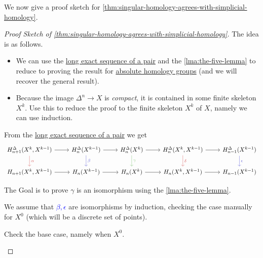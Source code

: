 We now give a proof sketch for \autoref{thm:singular-homology-agrees-with-simplicial-homology}.
\begin{proof}[Proof Sketch of \autoref{thm:singular-homology-agrees-with-simplicial-homology}]
	The idea is as follows.
	\begin{itemize}
		\item We can use the \hyperref[thm:long-exact-sequence-of-a-pair]{long exact sequence of a pair} and the \autoref{lma:the-five-lemma} to
		      reduce to proving the result for \hyperref[def:homology-group]{absolute homology groups} (and we will recover the general result).
		\item Because the image \(\Delta^n \to X\) is \emph{compact}, it is contained in some finite skeleton \(X^k\). Use this
		      to reduce the proof to the finite skeleton \(X^k\) of \(X\), namely we can use induction.
	\end{itemize}
	From the \hyperref[thm:long-exact-sequence-of-a-pair]{long exact sequence of a pair} we get
	\[
		\begin{tikzcd}
			{H^\Delta_{n+1}(X^k, X^{k-1})} & {H^\Delta_{n}(X^{k-1})} & {H^\Delta_{n}(X^{k})} & {H^\Delta_{n}(X^k, X^{k-1})} & {H^\Delta_{n-1}(X^{k-1})} \\
			{H_{n+1}(X^k, X^{k-1})} & {H_{n}(X^{k-1})} & {H_{n}(X^{k})} & {H_{n}(X^k, X^{k-1})} & {H_{n-1}(X^{k-1})}
			\arrow["\alpha", color={rgb,255:red,214;green,92;blue,92}, from=1-1, to=2-1]
			\arrow["\beta", color={rgb,255:red,92;green,92;blue,214}, from=1-2, to=2-2]
			\arrow["\gamma", color={rgb,255:red,124;green,194;blue,112}, from=1-3, to=2-3]
			\arrow["\delta", color={rgb,255:red,214;green,92;blue,92}, from=1-4, to=2-4]
			\arrow["\epsilon", color={rgb,255:red,92;green,92;blue,214}, from=1-5, to=2-5]
			\arrow[from=1-1, to=1-2]
			\arrow[from=1-2, to=1-3]
			\arrow[from=1-3, to=1-4]
			\arrow[from=1-4, to=1-5]
			\arrow[from=2-1, to=2-2]
			\arrow[from=2-2, to=2-3]
			\arrow[from=2-3, to=2-4]
			\arrow[from=2-4, to=2-5]
		\end{tikzcd}
	\]

	The Goal is to prove \(\gamma\) is an isomorphism using the \autoref{lma:the-five-lemma}.

	We assume that \textcolor{blue}{\(\beta, \epsilon \)} are isomorphisms by induction, checking the case manually for \(X^0\)
	(which will be a discrete set of points).
	\begin{exercise}
		Check the base case, namely when \(X^0\).
	\end{exercise}


\end{proof}

